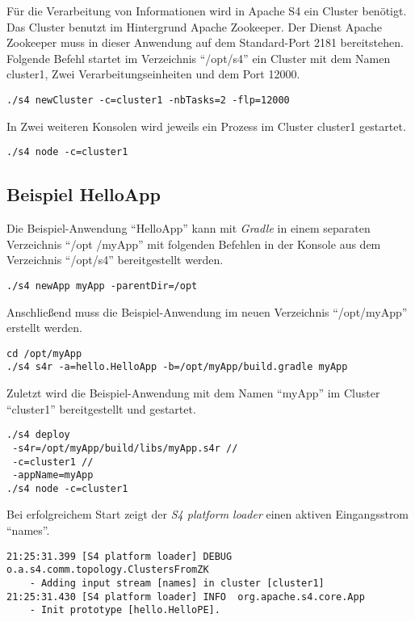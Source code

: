 Für die Verarbeitung von Informationen wird in Apache S4 ein Cluster benötigt. Das Cluster benutzt im Hintergrund Apache Zookeeper. Der Dienst Apache Zookeeper muss in dieser Anwendung auf dem Standard-Port 2181 bereitstehen. Folgende Befehl startet im Verzeichnis "`/opt/s4"' ein Cluster mit dem Namen cluster1, Zwei Verarbeitungseinheiten und dem Port 12000.

\begin{verbatim}
./s4 newCluster -c=cluster1 -nbTasks=2 -flp=12000
\end{verbatim}

In Zwei weiteren Konsolen wird jeweils ein Prozess im Cluster cluster1 gestartet.

\begin{verbatim}
./s4 node -c=cluster1
\end{verbatim}



\subsection{Beispiel HelloApp}
\label{s4:beispielHelloApp}

Die Beispiel-Anwendung "`HelloApp"' kann mit \textit{Gradle} in einem separaten Verzeichnis "`/opt /myApp"' mit folgenden Befehlen in der Konsole aus dem Verzeichnis "`/opt/s4"' bereitgestellt werden. 

\begin{verbatim}
./s4 newApp myApp -parentDir=/opt
\end{verbatim}

Anschließend muss die Beispiel-Anwendung im neuen Verzeichnis "`/opt/myApp"' erstellt werden.

\begin{verbatim}
cd /opt/myApp
./s4 s4r -a=hello.HelloApp -b=/opt/myApp/build.gradle myApp
\end{verbatim}

Zuletzt wird die Beispiel-Anwendung mit dem Namen "`myApp"' im Cluster "`cluster1"' bereitgestellt und gestartet.

\begin{verbatim}
./s4 deploy 
 -s4r=/opt/myApp/build/libs/myApp.s4r // 
 -c=cluster1 //
 -appName=myApp
./s4 node -c=cluster1
\end{verbatim}

Bei erfolgreichem Start zeigt der \textit{S4 platform loader} einen aktiven Eingangsstrom "`names"'.

\begin{verbatim}
21:25:31.399 [S4 platform loader] DEBUG o.a.s4.comm.topology.ClustersFromZK 
	- Adding input stream [names] in cluster [cluster1]
21:25:31.430 [S4 platform loader] INFO  org.apache.s4.core.App 
	- Init prototype [hello.HelloPE].
\end{verbatim}


